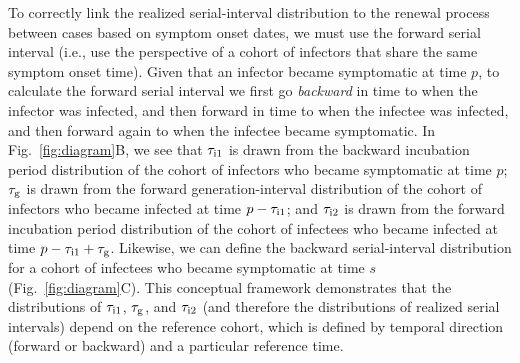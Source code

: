 \documentclass[12pt]{article}
\newcommand{\fref}[1]{Fig.~\ref{fig:#1}}
\newcommand{\psymp}{\ensuremath{p}} %
\newcommand{\ssymp}{\ensuremath{s}} %
\newcommand{\gtime}{\tau_{\rm g}} %
\begin{document}
To correctly link the realized serial-interval distribution to the renewal process
between cases based on symptom onset dates, we must use the forward
serial interval (i.e., use the perspective of a cohort of infectors
that share the same symptom onset time).  Given that an infector
became symptomatic at time $\psymp$, to calculate the forward serial
interval we first go \emph{backward} in time to when the infector was
infected, and then forward in time to when the infectee was infected,
and then forward again to when the infectee became symptomatic.
In \fref{diagram}B, we see that $\tau_{\rm i1}$ is drawn from
the backward incubation period distribution of the cohort
of infectors who became symptomatic at time $\psymp$; $\gtime$ is drawn from
the forward generation-interval distribution of the cohort of
infectors who became infected at time $\psymp - \tau_{\rm i1}$; and $\tau_{\rm i2}$
is drawn from the forward incubation period distribution of the cohort of
infectees who became infected at time $\psymp - \tau_{\rm i1} + \gtime$.
Likewise, we can define the backward serial-interval distribution for
a cohort of infectees who became symptomatic at time \ssymp
(\fref{diagram}C).  
This conceptual framework demonstrates that the distributions of $\tau_{\rm i1}$, $\gtime$, and $\tau_{\rm i2}$ (and therefore the distributions of realized serial intervals) depend on the reference cohort, which is defined by temporal direction (forward or backward) and a particular reference time.
\end{document}
